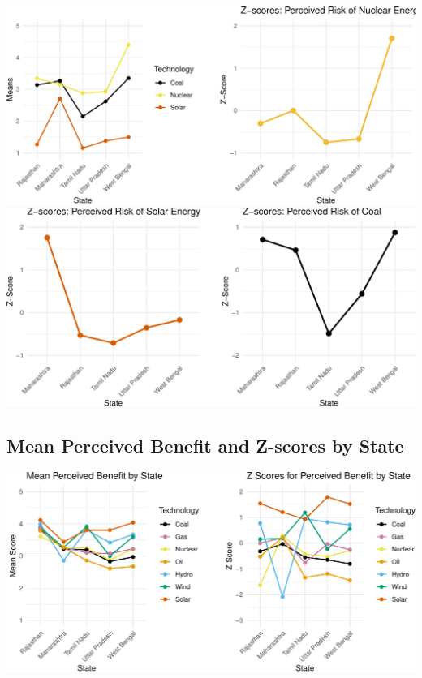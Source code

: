 \documentclass[
]{article}
\begin{document}
\includegraphics{nuclear-in-comparison_files/figure-latex/unnamed-chunk-29-1.pdf}
\includegraphics{nuclear-in-comparison_files/figure-latex/unnamed-chunk-29-2.pdf}

\newpage

\hypertarget{mean-perceived-benefit-and-z-scores-by-state}{%
\subsection{Mean Perceived Benefit and Z-scores by
State}\label{mean-perceived-benefit-and-z-scores-by-state}}

\includegraphics[width=1\linewidth,height=1\textheight]{nuclear-in-comparison_files/figure-latex/unnamed-chunk-32-1}
\end{document}
